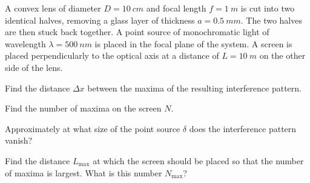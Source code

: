\documentclass[../TST.tex]{subfiles}
\begin{document}
\begin{pproblem}
A convex lens of diameter $D=\qty{10}{cm}$ and focal length $f=\qty{1}{m}$ is cut into two identical halves, removing a glass layer of thickness $a=\qty{0.5}{mm}$. The two halves are then stuck back together. A point source of monochromatic light of wavelength $\lambda=\qty{500}{nm}$ is placed in the focal plane of the system. A screen is placed perpendicularly to the optical axis at a distance of $L=\qty{10}{m}$ on the other side of the lens.
\end{pproblem}
\begin{subpart}
\item Find the distance $\Delta x$ between the maxima of the resulting interference pattern.
\item Find the number of maxima on the screen $N$.
\item Approximately at what size of the point source $\delta$ does the interference pattern vanish?
\item Find the distance $L_\mathrm{max}$ at which the screen should be placed so that the number of maxima is largest. What is this number $N_\mathrm{max}$?\\
\end{subpart}
\end{document}
